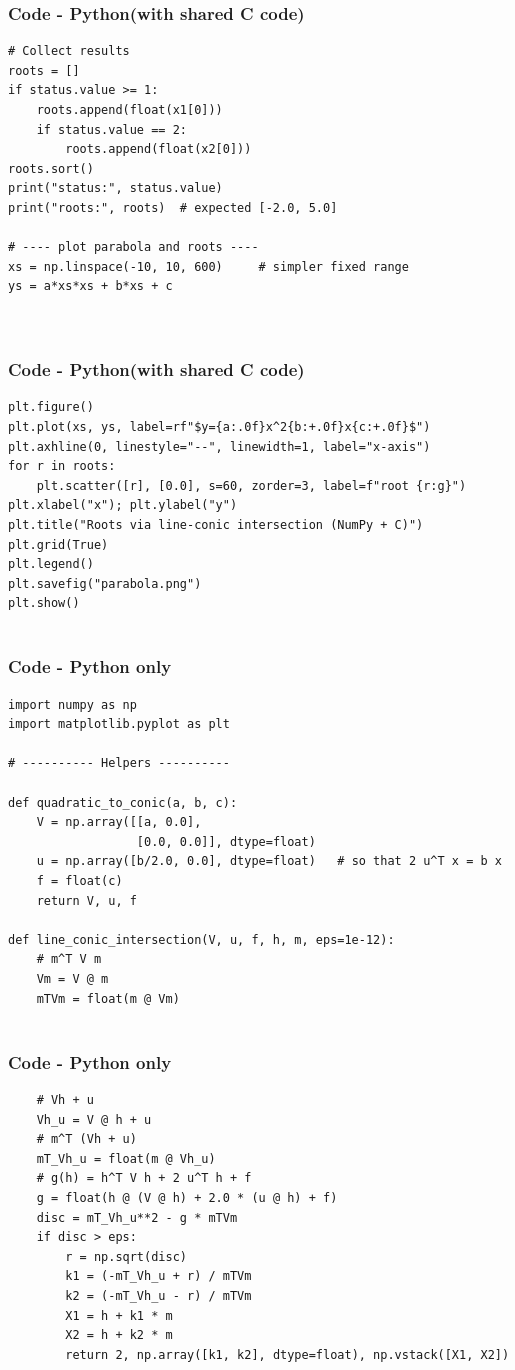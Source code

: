 \documentclass{beamer}
\theoremstyle{remark}
\numberwithin{equation}{section}
\begin{document}
\begin{frame}[fragile]
\frametitle{Code - Python(with shared C code)}
\begin{lstlisting}
# Collect results
roots = []
if status.value >= 1:
    roots.append(float(x1[0]))
    if status.value == 2:
        roots.append(float(x2[0]))
roots.sort()
print("status:", status.value)
print("roots:", roots)  # expected [-2.0, 5.0]

# ---- plot parabola and roots ----
xs = np.linspace(-10, 10, 600)     # simpler fixed range
ys = a*xs*xs + b*xs + c



\end{lstlisting}
\end{frame}

\begin{frame}[fragile]
\frametitle{Code - Python(with shared C code)}
\begin{lstlisting}
plt.figure()
plt.plot(xs, ys, label=rf"$y={a:.0f}x^2{b:+.0f}x{c:+.0f}$")
plt.axhline(0, linestyle="--", linewidth=1, label="x-axis")
for r in roots:
    plt.scatter([r], [0.0], s=60, zorder=3, label=f"root {r:g}")
plt.xlabel("x"); plt.ylabel("y")
plt.title("Roots via line-conic intersection (NumPy + C)")
plt.grid(True)
plt.legend()
plt.savefig("parabola.png")
plt.show()


\end{lstlisting}
\end{frame}



\begin{frame}[fragile]
\frametitle{Code - Python only}
\begin{lstlisting}
import numpy as np
import matplotlib.pyplot as plt

# ---------- Helpers ----------

def quadratic_to_conic(a, b, c):
    V = np.array([[a, 0.0],
                  [0.0, 0.0]], dtype=float)
    u = np.array([b/2.0, 0.0], dtype=float)   # so that 2 u^T x = b x
    f = float(c)
    return V, u, f

def line_conic_intersection(V, u, f, h, m, eps=1e-12):
    # m^T V m
    Vm = V @ m
    mTVm = float(m @ Vm)


\end{lstlisting}
\end{frame}

\begin{frame}[fragile]
\frametitle{Code - Python only}
\begin{lstlisting}
    # Vh + u
    Vh_u = V @ h + u
    # m^T (Vh + u)
    mT_Vh_u = float(m @ Vh_u)
    # g(h) = h^T V h + 2 u^T h + f
    g = float(h @ (V @ h) + 2.0 * (u @ h) + f)
    disc = mT_Vh_u**2 - g * mTVm
    if disc > eps:
        r = np.sqrt(disc)
        k1 = (-mT_Vh_u + r) / mTVm
        k2 = (-mT_Vh_u - r) / mTVm
        X1 = h + k1 * m
        X2 = h + k2 * m
        return 2, np.array([k1, k2], dtype=float), np.vstack([X1, X2])


\end{lstlisting}
\end{frame}
\end{document}
